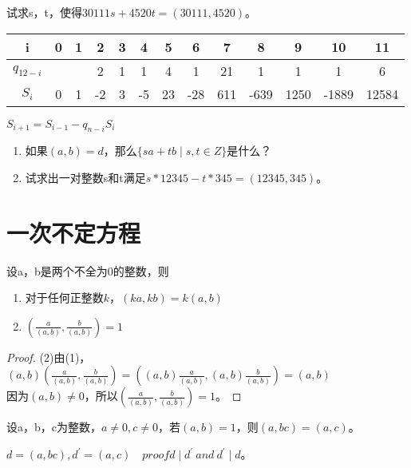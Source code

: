 \documentclass[cn,10pt]{elegantbook}
\begin{document}
\begin{example}
  试求s，t，使得$30111s+4520t = (30111,4520)$。
\end{example}
\begin{solution}
  \begin{tabular}{|c|c|c|c|c|c|c|c|c|c|c|c|c|}
    \hline i&0&1&2&3&4&5&6&7&8&9&10&11\\
    \hline $q_{12-i}$& & &2&1&1&4&1&21&1&1&1&6\\
    \hline $S_i$&0&1&-2&3&-5&23&-28&611&-639&1250&-1889&12584\\
    \hline
  \end{tabular}
\end{solution}
\begin{note}
  $S_{i+1}=S_{i-1}-q_{n-i}S_i$
\end{note}
\begin{exercise}
  \begin{enumerate}[1)]
    \item 如果$(a,b) = d$，那么$\{ sa+tb \mid s , t \in Z \} $是什么？
    \item 试求出一对整数s和t满足$s*12345 - t*345 = (12345,345)$。
  \end{enumerate}
\end{exercise}

\section{一次不定方程}
\begin{theorem}
  设a，b是两个不全为0的整数，则
  \begin{enumerate}[(1)]
    \item 对于任何正整数$k$，$(ka,kb)=k(a,b)$
    \item $(\frac{a}{(a,b)} ,\frac{b}{(a,b)} ) = 1$
  \end{enumerate}
\end{theorem}
\begin{proof}
  (2)由(1)，$(a,b)(\frac{a}{(a,b)} , \frac{b}{(a,b)})=((a,b)\frac{a}{(a,b)},(a,b)\frac{b}{(a,b)}) = (a,b)$\\
  因为$(a,b) \neq 0$，所以$(\frac{a}{(a,b)} , \frac{b}{(a,b)}) = 1$。
\end{proof}

\begin{theorem}
  设a，b，c为整数，$a \neq 0,c \neq 0$，若$(a,b) = 1$，则$(a,bc) = (a,c)$。
\end{theorem}
\begin{remark}
  $d = (a,bc),d^{\prime} = (a,c) \quad  proof d \mid d^{\prime} \ and \ d^{\prime} \mid d$。 
\end{remark}
\end{document}
